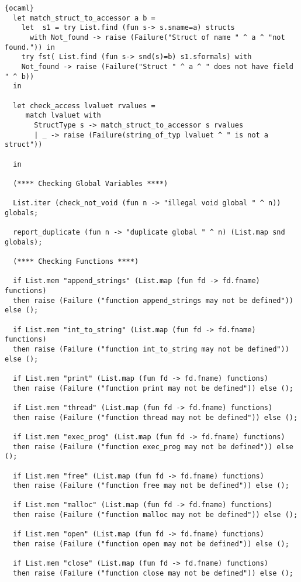 \begin{lstlisting}{ocaml}
  let match_struct_to_accessor a b = 
    let  s1 = try List.find (fun s-> s.sname=a) structs 
      with Not_found -> raise (Failure("Struct of name " ^ a ^ "not found.")) in
    try fst( List.find (fun s-> snd(s)=b) s1.sformals) with
	Not_found -> raise (Failure("Struct " ^ a ^ " does not have field " ^ b))
  in

  let check_access lvaluet rvalues =
     match lvaluet with
       StructType s -> match_struct_to_accessor s rvalues
       | _ -> raise (Failure(string_of_typ lvaluet ^ " is not a struct"))
	
  in

  (**** Checking Global Variables ****)

  List.iter (check_not_void (fun n -> "illegal void global " ^ n)) globals;
   
  report_duplicate (fun n -> "duplicate global " ^ n) (List.map snd globals);

  (**** Checking Functions ****)

  if List.mem "append_strings" (List.map (fun fd -> fd.fname) functions)
  then raise (Failure ("function append_strings may not be defined")) else ();

  if List.mem "int_to_string" (List.map (fun fd -> fd.fname) functions)
  then raise (Failure ("function int_to_string may not be defined")) else ();

  if List.mem "print" (List.map (fun fd -> fd.fname) functions)
  then raise (Failure ("function print may not be defined")) else ();

  if List.mem "thread" (List.map (fun fd -> fd.fname) functions)
  then raise (Failure ("function thread may not be defined")) else ();

  if List.mem "exec_prog" (List.map (fun fd -> fd.fname) functions)
  then raise (Failure ("function exec_prog may not be defined")) else ();

  if List.mem "free" (List.map (fun fd -> fd.fname) functions)
  then raise (Failure ("function free may not be defined")) else ();

  if List.mem "malloc" (List.map (fun fd -> fd.fname) functions)
  then raise (Failure ("function malloc may not be defined")) else ();

  if List.mem "open" (List.map (fun fd -> fd.fname) functions)
  then raise (Failure ("function open may not be defined")) else ();

  if List.mem "close" (List.map (fun fd -> fd.fname) functions)
  then raise (Failure ("function close may not be defined")) else ();


\end{lstlisting}
